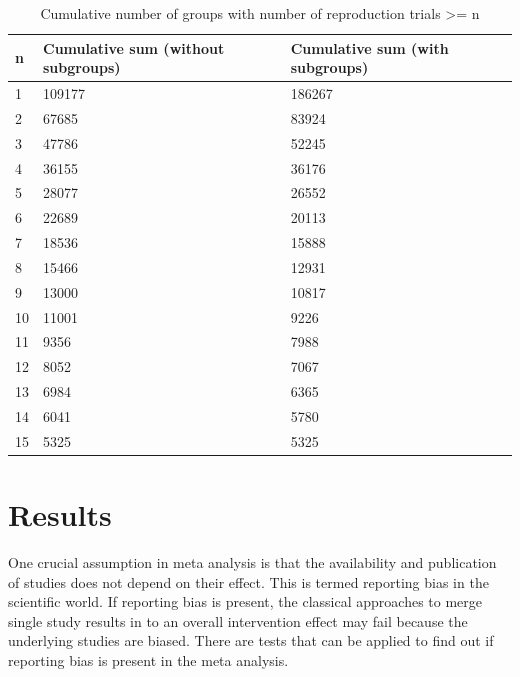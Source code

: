 \documentclass[11pt,a4paper,twoside]{book}\usepackage[]{graphicx}\usepackage[]{color}
\begin{document}
\begin{table}[ht]
\centering
\begingroup\footnotesize
\begin{tabular}{lll}
  \hline
n & Cumulative sum (without subgroups) & Cumulative sum (with subgroups) \\ 
  \hline
1 & 109177 & 186267 \\ 
  2 & 67685 & 83924 \\ 
  3 & 47786 & 52245 \\ 
  4 & 36155 & 36176 \\ 
  5 & 28077 & 26552 \\ 
  6 & 22689 & 20113 \\ 
  7 & 18536 & 15888 \\ 
  8 & 15466 & 12931 \\ 
  9 & 13000 & 10817 \\ 
  10 & 11001 & 9226 \\ 
  11 & 9356 & 7988 \\ 
  12 & 8052 & 7067 \\ 
  13 & 6984 & 6365 \\ 
  14 & 6041 & 5780 \\ 
  15 & 5325 & 5325 \\ 
   \hline
\end{tabular}
\endgroup
\caption{Cumulative number of groups with number of reproduction trials >= n} 
\label{repr.groups}
\end{table}
















\chapter{Results}

One crucial assumption in meta analysis is that the availability and publication of studies does not depend on their effect. This is termed reporting bias in the scientific world. If reporting bias is present, the classical approaches to merge single study results in to an overall intervention effect may fail because the underlying studies are biased. There are tests that can be applied to find out if reporting bias is present in the meta analysis.
\end{document}
